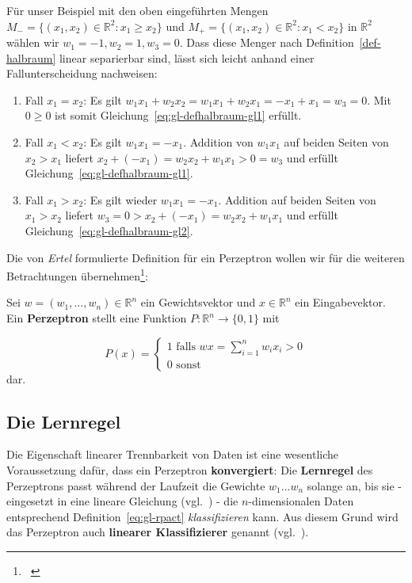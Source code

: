\noindent
Für unser Beispiel mit den oben eingeführten Mengen $M_- = \{(x_1, x_2) \in  \mathbb{R}^2: x_1 \geq x_2\}$ und $M_+=\{(x_1, x_2) \in  \mathbb{R}^2: x_1 < x_2\}$ in $ \mathbb{R}^2$ wählen wir $w_1 = -1, w_2 = 1, w_3 = 0$.
Dass diese Menger nach Definition~\ref{def-halbraum} linear separierbar sind, lässt sich leicht anhand einer Fallunterscheidung nachweisen:

\begin{enumerate}
    \item Fall $x_1 = x_2$: Es gilt $w_1x_1 + w_2x_2 = w_1x_1 + w_2x_1 = -x_1 + x_1 = w_3 = 0$. Mit $0 \geq 0$ ist somit Gleichung~\ref{eq:gl-defhalbraum-gl1} erfüllt.
    \item Fall $x_1 < x_2$: Es gilt $w_1x_1 = -x_1$. Addition von $w_1x_1$ auf beiden Seiten von $x_2 > x_1$ liefert $x_2 + (-x_1) = w_2x_2 + w_1x_1 > 0 = w_3$ und erfüllt Gleichung~\ref{eq:gl-defhalbraum-gl1}.
    \item Fall $x_1 > x_2$: Es gilt wieder $w_1x_1 = -x_1$. Addition auf beiden Seiten von $x_1 > x_2$ liefert $w_3 = 0 > x_2 + (-x_1) = w_2x_2 + w_1x_1$ und erfüllt Gleichung~\ref{eq:gl-defhalbraum-gl2}.
\end{enumerate}


\noindent
Die von \textit{Ertel} formulierte Definition für ein Perzeptron wollen wir für die weiteren Betrachtungen übernehmen\footnote{
    ~\cite[212, ``Definition 8.3``, Hervorhebungen i.O.]{Ert21a}
}:

\begin{definition}
\noindent
Sei $w = (w_1, ..., w_n) \in  \mathbb{R}^n$ ein Gewichtsvektor und $x \in  \mathbb{R}^n$ ein Eingabevektor. Ein \textbf{Perzeptron} stellt eine Funktion $P:  \mathbb{R}^n \to \{0, 1\}$ mit

\begin{equation}
P(x) = \begin{cases}
            1 \text{ falls } wx = \sum^n_{i=1} w_ix_i >0 \\
            0 \text{ sonst }
\end{cases}
\end{equation}
\noindent
dar.

\end{definition}

\subsection{Die Lernregel}\label{sec:lernregel}

Die Eigenschaft linearer Trennbarkeit von Daten ist eine wesentliche Voraussetzung dafür, dass ein Perzeptron \textbf{konvergiert}: Die \textbf{Lernregel} des Perzeptrons passt während der Laufzeit die Gewichte $w_1 ... w_n$ solange an, bis sie - eingesetzt in eine lineare Gleichung (vgl.~\cite[311]{Ert21b}) - die $n$-dimensionalen Daten entsprechend Definition~\ref{eq:gl-rpact} \textit{klassifizieren} kann.
Aus diesem Grund wird das Perzeptron auch \textbf{linearer Klassifizierer} genannt (vgl.~\cite[210-216]{Ert21a}).

